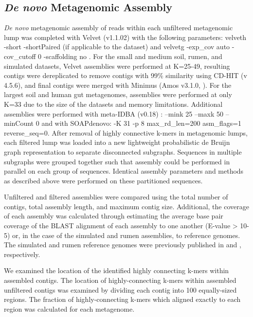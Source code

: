 \documentclass[11pt]{article} %
\begin{document}
\subsection{\emph{De novo} Metagenomic Assembly}

\emph{De novo} metagenomic assembly of reads within each unfiltered metagenomic lump was completed with Velvet (v1.1.02) with the following parameters: velveth -short -shortPaired (if applicable to the dataset) and velvetg -exp\_cov auto -cov\_cutoff 0 -scaffolding no \cite{Zerbino:2008p665}.  For the small and medium soil, rumen, and simulated datasets, Velvet assemblies were performed at K=25-49, resulting contigs were dereplicated to remove contigs with 99\% similarity using CD-HIT (v 4.5.6), and final contigs were merged with Minimus (Amos v3.1.0, \cite{Sommer:2007p1253}).  For the largest soil and human gut metagenomes, assemblies were performed at only K=33 due to the size of the datasets and memory limitations.  Additional assemblies were performed with meta-IDBA (v0.18) \cite{Peng:2011p898} : --mink 25 --maxk 50 --minCount 0 and with SOAPdenovo:  -K 31 -p 8  max\_rd\_len=200 asm\_flags=1 reverse\_seq=0.  After removal of highly connective k-mers in metagenomic lumps, each filtered lump was loaded into a new lightweight probabilistic de Bruijn graph representation to separate disconnected subgraphs.  Sequences in multiple subgraphs were grouped together such that assembly could be performed in parallel on each group of sequences.  Identical assembly parameters and methods as described above were performed on these partitioned sequences.

Unfiltered and filtered assemblies were compared using the total number of contigs, total assembly length, and maximum contig size.  Additional, the coverage of each assembly was calculated through estimating the average base pair coverage of the BLAST alignment of each assembly to one another (E-value > 10-5) or, in the case of the simulated and rumen assemblies, to reference genomes.  The simulated and rumen reference genomes were previously published in \cite{Hess:2011p686} and \cite{Pignatelli:2011p742}, respectively. 

We examined the location of the identified highly connecting k-mers within assembled contigs.  The location of highly-connecting k-mers within assembled unfiltered contigs was examined by dividing each contig into 100 equally-sized regions.  The fraction of highly-connecting k-mers which aligned exactly to each region was calculated for each metagenome.
\end{document}

